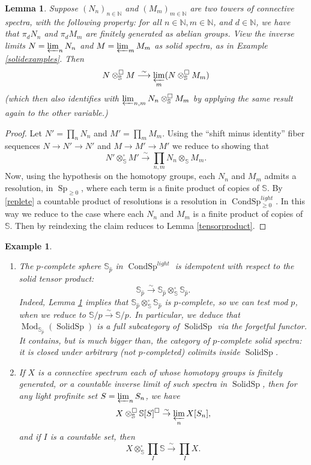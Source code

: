 \documentclass[12pt]{article}
\newtheorem{lemma}[theorem]{Lemma}
\newtheorem{example}[theorem]{Example}
\newcommand{\on}{\operatorname}
\newcommand{\mbb}{\mathbb}
\begin{document}
\begin{lemma}\label{tensorlimit}
Suppose $(N_n)_{n\in\mathbb{N}}$ and $(M_m)_{m\in\mathbb{N}}$ are two towers of connective spectra, with the following property: for all $n\in\mathbb{N},m\in \mathbb{N}$, and $d\in\mathbb{N}$, we have that $\pi_d N_n$ and $\pi_d M_m$ are finitely generated as abelian groups.  View the inverse limits $N=\varprojlim_n N_n$ and $M=\varprojlim_m M_m$ as solid spectra, as in Example \ref{solidexamples}.  Then
$$N\otimes^\square_\mathbb{S} M \overset{\sim}{\longrightarrow} \varprojlim_m (N\otimes^{\square}_\mathbb{S} M_m)$$
(which then also identifies with $\varprojlim_{n,m} N_n\otimes^\square_{\mbb{S}} M_m$ by applying the same result again to the other variable.)
\end{lemma}
\begin{proof}
Let $N' = \prod_n N_n$ and $M'=\prod_m M_m$.  Using the ``shift minus identity'' fiber sequences $N \to N'\to N'$ and $M\to M'\to M'$ we reduce to showing that
$$N'\otimes^\square_\mathbb{S} M' \overset{\sim}{\rightarrow} \prod_{n,m} N_n\otimes_\mathbb{S}M_m.$$
Now, using the hypothesis on the homotopy groups, each $N_n$ and $M_m$ admits a resolution, in $\on{Sp}_{\geq 0}$, where each term is a finite product of copies of $\mathbb{S}$.  By \ref{replete} a countable product of resolutions is a resolution in $\on{CondSp}^{light}_{\geq 0}$.  In this way we reduce to the case where each $N_n$ and $M_m$ is a finite product of copies of $\mathbb{S}$.  Then by reindexing the claim reduces to Lemma \ref{tensorproduct}.
\end{proof}

\begin{example}\label{tensorexamples}
\begin{enumerate}
\item The $p$-complete sphere $\mathbb{S}_{\widehat{p}}$ in $\on{CondSp}^{light}$ is idempotent with respect to the solid tensor product:
$$\mathbb{S}_{\widehat{p}}\overset{\sim}{\rightarrow}\mathbb{S}_{\widehat{p}}\otimes^\square_\mathbb{S}\mathbb{S}_{\widehat{p}}.$$
Indeed, Lemma \ref{tensorlimit} implies that $\mathbb{S}_{\widehat{p}}\otimes^\square_\mathbb{S}\mathbb{S}_{\widehat{p}}$ is $p$-complete, so we can test mod $p$, when we reduce to $\mathbb{S}/p\overset{\sim}{\rightarrow}\mathbb{S}/p$.
In particular, we deduce that $\on{Mod}_{\mathbb{S}_{\widehat{p}}}(\on{SolidSp})$ is a full subcategory of $\on{SolidSp}$ via the forgetful functor.  It contains, but is much bigger than, the category of $p$-complete solid spectra: it is closed under arbitrary (not $p$-completed) colimits inside $\on{SolidSp}$.
\item If $X$ is a connective spectrum each of whose homotopy groups is finitely generated, or a countable inverse limit of such spectra in $\on{SolidSp}$, then for any light profinite set $S=\varprojlim_n S_n$, we have
$$X\otimes^\square_\mathbb{S} \mathbb{S}[S]^\square\overset{\sim}{\rightarrow}\varprojlim_n X[S_n],$$
and if $I$ is a countable set, then
$$X\otimes^\square_\mathbb{S}\prod_I\mathbb{S}\overset{\sim}{\rightarrow} \prod_I X.$$
\end{enumerate}
\end{example}
\end{document}
